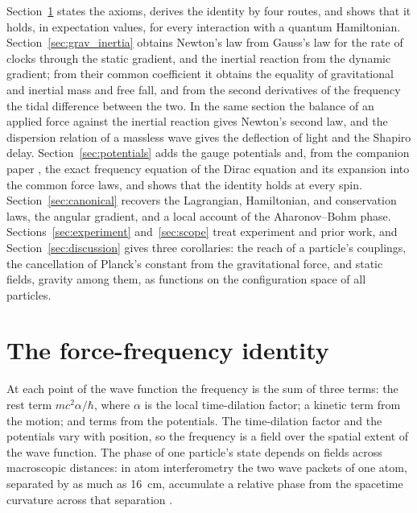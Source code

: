 \documentclass[aps,prd,onecolumn,tightenlines,nofootinbib,notitlepage,11pt,floatfix]{revtex4-2}
\newif\ifsupplement
\theoremstyle{indentedtheorem}
\begin{document}
Section~\ref{sec:identity} states the axioms, derives the identity by four routes, and shows that it holds, in expectation values, for every interaction with a quantum Hamiltonian. Section~\ref{sec:grav_inertia} obtains Newton's law from Gauss's law for the rate of clocks through the static gradient, and the inertial reaction from the dynamic gradient; from their common coefficient it obtains the equality of gravitational and inertial mass and free fall, and from the second derivatives of the frequency the tidal difference between the two. In the same section the balance of an applied force against the inertial reaction gives Newton's second law, and the dispersion relation of a massless wave gives the deflection of light and the Shapiro delay. Section~\ref{sec:potentials} adds the gauge potentials and, from the companion paper \citep{HutchisonWavefn2026}, the exact frequency equation of the Dirac equation and its expansion into the common force laws, and shows that the identity holds at every spin. Section~\ref{sec:canonical} recovers the Lagrangian, Hamiltonian, and conservation laws, the angular gradient, and a local account of the Aharonov--Bohm phase. Sections~\ref{sec:experiment} and~\ref{sec:scope} treat experiment and prior work, and Section~\ref{sec:discussion} gives three corollaries: the reach of a particle's couplings, the cancellation of Planck's constant from the gravitational force, and static fields, gravity among them, as functions on the configuration space of all particles. \ifsupplement The supplemental material after the bibliography gives the notation and conventions and, in full, the derivations that the main text compresses.\fi

\section{The force-frequency identity}
\label{sec:identity}

At each point of the wave function the frequency is the sum of three terms: the rest term $mc^2\alpha/\hbar$, where $\alpha$ is the local time-dilation factor; a kinetic term from the motion; and terms from the potentials. The time-dilation factor and the potentials vary with position, so the frequency is a field over the spatial extent of the wave function. The phase of one particle's state depends on fields across macroscopic distances: in atom interferometry the two wave packets of one atom, separated by as much as 16~cm, accumulate a relative phase from the spacetime curvature across that separation \citep{Asenbaum2017Phase}.
\end{document}
